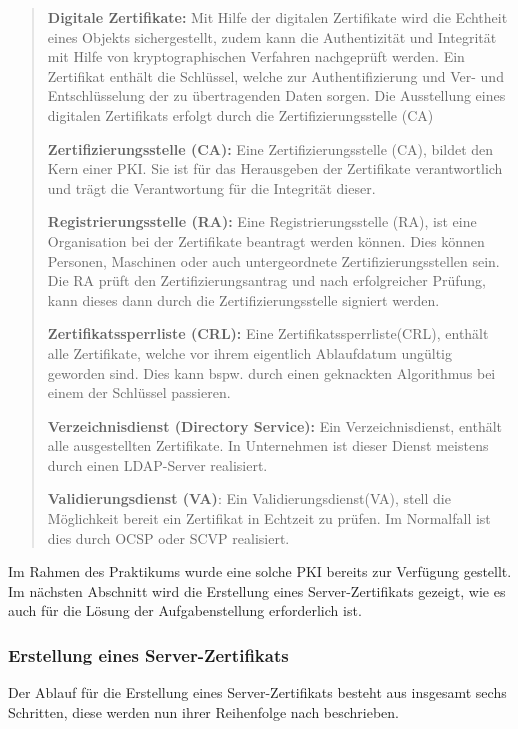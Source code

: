 \documentclass[
a4paper,     %
 headsepline, %
footsepline, %
titlepage,   %
 halfparskip,     %
 fleqn,       %
12pt         %
]{scrartcl}  %
\begin{document}
\begin{quotation}
\item [\textbf{Digitale Zertifikate:}]
Mit Hilfe der digitalen Zertifikate wird die Echtheit eines Objekts sichergestellt, zudem kann die Authentizität und Integrität mit Hilfe von kryptographischen Verfahren nachgeprüft werden. Ein Zertifikat enthält die Schlüssel, welche zur Authentifizierung und Ver- und Entschlüsselung der zu übertragenden Daten sorgen. Die Ausstellung eines digitalen Zertifikats erfolgt durch die Zertifizierungsstelle (CA)
\item [\textbf{Zertifizierungsstelle (CA):}]Eine Zertifizierungsstelle (CA), bildet den Kern einer PKI. Sie ist für das Herausgeben der Zertifikate verantwortlich und trägt die Verantwortung für die Integrität dieser. 
\item [\textbf{Registrierungsstelle (RA):}]Eine Registrierungsstelle (RA), ist eine Organisation bei der Zertifikate beantragt werden können. Dies können Personen, Maschinen oder auch untergeordnete Zertifizierungsstellen sein. Die RA prüft den Zertifizierungsantrag und nach erfolgreicher Prüfung, kann dieses dann durch die Zertifizierungsstelle signiert werden. 
\item [\textbf{Zertifikatssperrliste (CRL):}] Eine Zertifikatssperrliste(CRL), enthält alle Zertifikate, welche vor ihrem eigentlich Ablaufdatum ungültig geworden sind. Dies kann bspw. durch einen geknackten Algorithmus bei einem der Schlüssel passieren. 
\item [\textbf{Verzeichnisdienst (Directory Service):}] Ein Verzeichnisdienst, enthält alle ausgestellten Zertifikate. In Unternehmen ist dieser Dienst meistens durch einen LDAP-Server realisiert. 
\item [\textbf{Validierungsdienst (VA)}:] Ein Validierungsdienst(VA), stell die Möglichkeit bereit ein Zertifikat in Echtzeit zu prüfen. Im Normalfall ist dies durch OCSP oder SCVP realisiert.  
\end{quotation}

Im Rahmen des Praktikums wurde eine solche PKI bereits zur Verfügung gestellt. Im nächsten Abschnitt wird die Erstellung eines Server-Zertifikats gezeigt, wie es auch für die Lösung der Aufgabenstellung erforderlich ist. 
\subsubsection{Erstellung eines Server-Zertifikats}
Der Ablauf für die Erstellung eines Server-Zertifikats besteht aus insgesamt sechs Schritten, diese werden nun ihrer Reihenfolge nach beschrieben. 
\end{document}
